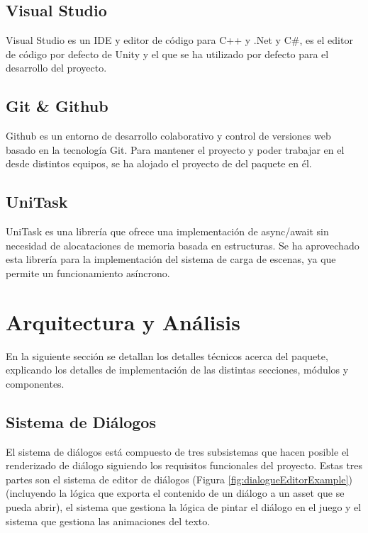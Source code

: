 \subsection{Visual Studio}

Visual Studio\cite{visualstudio} es un IDE y editor de código para C++ y .Net y C\#, es el editor de código por defecto de Unity y el que se ha utilizado por defecto para el desarrollo del proyecto. 

\subsection{Git \& Github}

Github\cite{github} es un entorno de desarrollo colaborativo y control de versiones web basado en la tecnología Git. Para mantener el proyecto y poder trabajar en el desde distintos equipos, se ha alojado el proyecto de del paquete\cite{Repo} en él.

\subsection{UniTask}

UniTask\cite{UniTask} es una librería que ofrece una implementación de async/await sin necesidad de alocataciones de memoria basada en estructuras. Se ha aprovechado esta librería para la implementación del sistema de carga de escenas, ya que permite
 un funcionamiento asíncrono.

\section{Arquitectura y Análisis}
En la siguiente sección se detallan los detalles técnicos acerca del paquete, explicando los detalles de implementación de las distintas secciones, módulos y componentes.

\subsection{Sistema de Diálogos}
El sistema de diálogos está compuesto de tres subsistemas que hacen posible el renderizado de diálogo siguiendo los requisitos funcionales del proyecto. Estas tres partes son
el sistema de editor de diálogos (Figura \ref{fig:dialogueEditorExample}) (incluyendo la lógica que exporta el contenido de un diálogo a un asset que se pueda abrir), el sistema que gestiona la lógica de pintar el 
diálogo en el juego y el sistema que gestiona las animaciones del texto.

